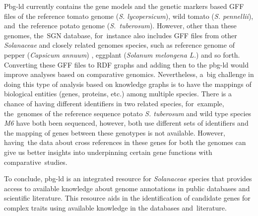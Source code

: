 \documentclass[applsci,article,accept,moreauthors,pdftex]{Definitions/mdpi}
\begin{document}
{Pbg-ld currently contains the gene models and the genetic markers based GFF files of the reference tomato genome (\textit{S. lycopersicum}), wild tomato  (\textit{S. pennellii}), and~the reference potato genome (\textit{S.~tuberosum}). However, other than these genomes, the~SGN database, for~instance also includes GFF files from other \textit{Solanaceae} %
and closely related genomes species, such as reference genome of pepper (\textit{Capsicum annuum}) \cite{hulse2018reference}, eggplant (\textit{Solanum melongena L.}) \cite{hirakawa2014draft} and so forth. Converting these GFF files to RDF graphs and adding then to the pbg-ld would improve analyses based on comparative genomics. Nevertheless, a~big challenge in doing this type of analysis based on knowledge graphs is to have the mappings of biological entities (genes, proteins, etc.) among multiple species. There is a chance of having different identifiers in two related species, for~example, the~genomes of the reference sequence potato \textit{S. tuberosum} and wild type species \textit{M6} have both been sequenced, however, both use different sets of identifiers and the mapping of genes between these genotypes is not available. However, having~the data about cross references in these genes for both the genomes can give us better insights into underpinning certain gene functions with comparative~studies. 

To conclude, pbg-ld is an integrated resource for \textit{Solanaceae} species that provides access to available knowledge about genome annotations in public databases and scientific literature. This resource aids in the identification of candidate genes for complex traits using available knowledge in the databases and~literature.







}
\end{document}
